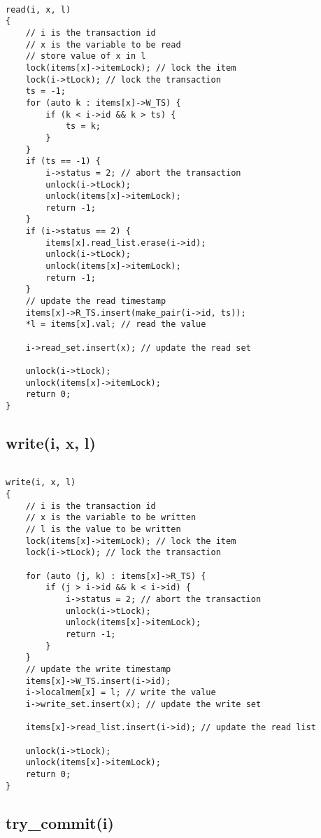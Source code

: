 \documentclass[12pt]{article}
\begin{document}
\begin{lstlisting}

read(i, x, l)
{
    // i is the transaction id
    // x is the variable to be read
    // store value of x in l
    lock(items[x]->itemLock); // lock the item
    lock(i->tLock); // lock the transaction
    ts = -1;
    for (auto k : items[x]->W_TS) {
        if (k < i->id && k > ts) {
            ts = k;
        }
    }
    if (ts == -1) {
        i->status = 2; // abort the transaction
        unlock(i->tLock);
        unlock(items[x]->itemLock);
        return -1;
    }
    if (i->status == 2) {
        items[x].read_list.erase(i->id);
        unlock(i->tLock);
        unlock(items[x]->itemLock);
        return -1;
    }
    // update the read timestamp
    items[x]->R_TS.insert(make_pair(i->id, ts));
    *l = items[x].val; // read the value
    
    i->read_set.insert(x); // update the read set

    unlock(i->tLock);
    unlock(items[x]->itemLock);
    return 0;
}

\end{lstlisting}

\subsection*{write(i, x, l)}

\begin{lstlisting}

write(i, x, l)
{
    // i is the transaction id
    // x is the variable to be written
    // l is the value to be written
    lock(items[x]->itemLock); // lock the item
    lock(i->tLock); // lock the transaction
    
    for (auto (j, k) : items[x]->R_TS) {
        if (j > i->id && k < i->id) {
            i->status = 2; // abort the transaction
            unlock(i->tLock);
            unlock(items[x]->itemLock);
            return -1;
        }
    }
    // update the write timestamp
    items[x]->W_TS.insert(i->id);
    i->localmem[x] = l; // write the value
    i->write_set.insert(x); // update the write set

    items[x]->read_list.insert(i->id); // update the read list
    
    unlock(i->tLock);
    unlock(items[x]->itemLock);
    return 0;
}

\end{lstlisting}

\subsection*{try\_commit(i)}
\end{document}
